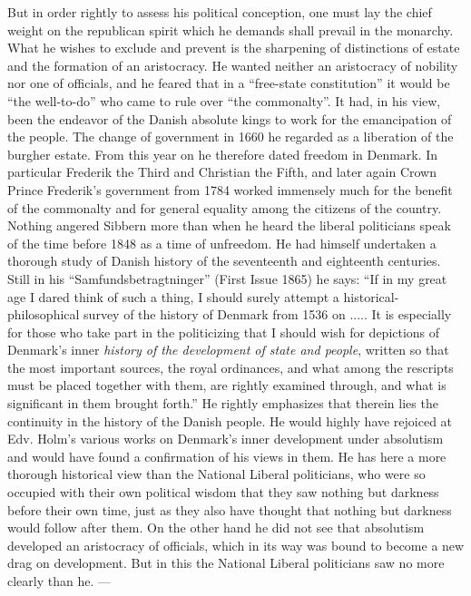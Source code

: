 \documentclass[12pt,a4paper,openany]{book}
\newcommand{\opage}[1]{\marginnote{\footnotesize\textit{[#1]}}}
\begin{document}
But in order rightly to assess his political conception, one must
lay the chief weight on the republican spirit which he
demands shall prevail in the monarchy. What he wishes to exclude
and prevent is the sharpening of distinctions of estate and the formation of
an aristocracy. He wanted neither an aristocracy of nobility nor one of officials, and he
feared that in a ``free-state constitution'' it would be ``the well-to-do'' who came to
rule over ``the commonalty''. It had, in his view,
been the endeavor of the Danish absolute kings to work
for the emancipation of the people. The change of government in 1660
he regarded as a liberation of the burgher estate. From
this year on he therefore dated freedom in Denmark. In particular
Frederik the Third and Christian the Fifth, and later
again Crown Prince Frederik's government from 1784 worked immensely
much for the benefit of the commonalty and for general equality
among the citizens of the country. Nothing angered Sibbern more than
when he heard the liberal politicians speak of the time before 1848
as a time of unfreedom. He had himself undertaken a thorough
study of Danish history of the seventeenth and eighteenth centuries.
Still in his ``Samfundsbetragtninger'' (First Issue 1865)
he says: ``If in my great age I dared think of
such a thing, I should surely attempt a historical-philosophical
survey of the history of Denmark from 1536 on ..... It is especially for
those who take part in the politicizing that I should wish for depictions
of Denmark's inner \emph{history of the development of state and people}, written
so that the most important sources, the royal ordinances,
and what among the rescripts must be placed together with
them, are rightly examined through, and what is significant in
them brought forth.'' He rightly emphasizes that therein lies
\opage{103}the continuity in the history of the Danish people. He would highly
have rejoiced at Edv. Holm's various works on
Denmark's inner development under absolutism and would have
found a confirmation of his views in them. He has
here a more thorough historical view than the National Liberal
politicians, who were so occupied with their own political wisdom that
they saw nothing but darkness before their own time, just as they
also have thought that nothing but darkness would follow
after them. On the other hand he did not see that absolutism developed
an aristocracy of officials, which in its way was bound to become a new drag on
development. But in this the National Liberal politicians
saw no more clearly than he. ---
\end{document}
